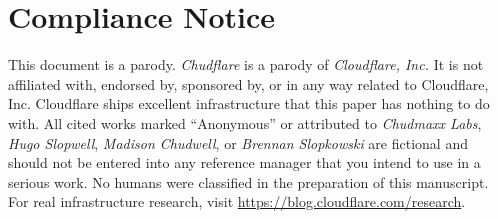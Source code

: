 \documentclass[10pt,twocolumn,letterpaper]{article}
\begin{document}
\section*{Compliance Notice}
{\footnotesize
This document is a parody. \emph{Chudflare} is a parody of \emph{Cloudflare,
Inc.} It is not affiliated with, endorsed by, sponsored by, or in any way
related to Cloudflare, Inc. Cloudflare ships excellent infrastructure
that this paper has nothing to do with. All cited works marked
``Anonymous'' or attributed to \emph{Chudmaxx Labs}, \emph{Hugo Slopwell},
\emph{Madison Chudwell}, or \emph{Brennan Slopkowski} are fictional and
should not be entered into any reference manager that you intend to use
in a serious work. No humans were classified in the preparation of this
manuscript. For real infrastructure research, visit
\url{https://blog.cloudflare.com/research}.\par}
\end{document}
